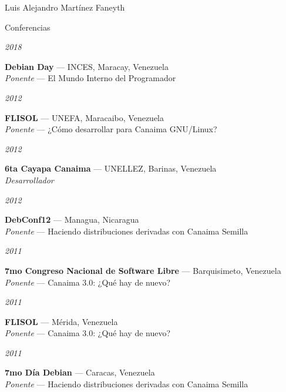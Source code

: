 \documentclass[10pt,letterpaper]{article}
\begin{document}
\begin{cv}{Luis Alejandro Mart\'inez Faneyth}
\begin{cvlist}{Conferencias}
\item[{\parbox[t]{6em}{\textit{\large{2018}}}}]{
	\parbox[t]{\linewidth}{
		\textbf{Debian Day} --- INCES, Maracay, Venezuela\\
		\textit{Ponente} --- El Mundo Interno del Programador
	}
}
\item[{\parbox[t]{6em}{\textit{\large{2012}}}}]{
	\parbox[t]{\linewidth}{
		\textbf{FLISOL} --- UNEFA, Maracaibo, Venezuela\\
		\textit{Ponente} --- ¿C\'omo desarrollar para Canaima GNU/Linux?
	}
}
\item[{\parbox[t]{6em}{\textit{\large{2012}}}}]{
	\parbox[t]{\linewidth}{
		\textbf{6ta Cayapa Canaima} --- UNELLEZ, Barinas, Venezuela\\
		\textit{Desarrollador}
	}
}
\item[{\parbox[t]{6em}{\textit{\large{2012}}}}]{
	\parbox[t]{\linewidth}{
		\textbf{DebConf12} --- Managua, Nicaragua\\
		\textit{Ponente} --- Haciendo distribuciones derivadas con Canaima Semilla
	}
}
\item[{\parbox[t]{6em}{\textit{\large{2011}}}}]{
	\parbox[t]{\linewidth}{
		\textbf{7mo Congreso Nacional de Software Libre} --- Barquisimeto, Venezuela\\
		\textit{Ponente} --- Canaima 3.0: ¿Qu\'e hay de nuevo?
	}
}
\item[{\parbox[t]{6em}{\textit{\large{2011}}}}]{
	\parbox[t]{\linewidth}{
		\textbf{FLISOL} --- M\'erida, Venezuela\\
		\textit{Ponente} --- Canaima 3.0: ¿Qu\'e hay de nuevo?
	}
}
\item[{\parbox[t]{6em}{\textit{\large{2011}}}}]{
	\parbox[t]{\linewidth}{
		\textbf{7mo D\'ia Debian} --- Caracas, Venezuela\\
		\textit{Ponente} --- Haciendo distribuciones derivadas con Canaima Semilla
	}
}
\end{cvlist}

\end{cv}
\end{document}
